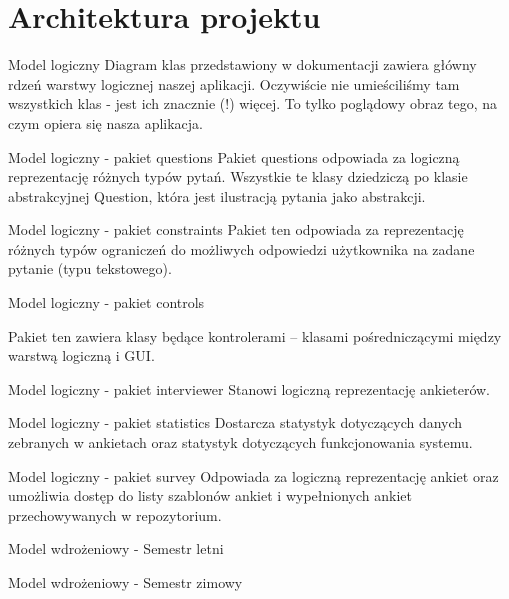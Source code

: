 \documentclass[a4paper,10pt]{beamer}
\begin{document}
	
	\section{Architektura projektu}
	
	
	\begin{frame}{Model logiczny}
		Diagram klas przedstawiony w dokumentacji zawiera główny rdzeń warstwy logicznej naszej aplikacji. Oczywiście nie umieściliśmy tam wszystkich klas - jest ich znacznie (!) więcej. To tylko poglądowy obraz tego, na czym opiera się nasza aplikacja.
	\end{frame}
	\begin{frame}{Model logiczny - pakiet questions}
		Pakiet questions odpowiada za logiczną reprezentację różnych typów pytań. 	Wszystkie te klasy dziedziczą po klasie abstrakcyjnej Question, która jest ilustracją pytania jako abstrakcji.
	\end{frame}
	\begin{frame}{Model logiczny - pakiet constraints}
		Pakiet ten odpowiada za reprezentację różnych typów ograniczeń do możliwych odpowiedzi użytkownika na zadane pytanie (typu tekstowego).
		
	\end{frame}
	

	\begin{frame}{Model logiczny - pakiet controls}
		
		Pakiet ten zawiera klasy będące kontrolerami – klasami pośredniczącymi między warstwą logiczną i GUI.
	\end{frame}
	
	\begin{frame}{Model logiczny - pakiet interviewer}
		Stanowi logiczną reprezentację ankieterów.
	\end{frame}
	\begin{frame}{Model logiczny - pakiet statistics}
		Dostarcza statystyk dotyczących danych zebranych w ankietach oraz statystyk dotyczących funkcjonowania systemu.
	\end{frame}
	\begin{frame}{Model logiczny - pakiet survey}
		Odpowiada za logiczną reprezentację ankiet oraz umożliwia dostęp do listy szablonów ankiet i wypełnionych ankiet przechowywanych w repozytorium.
	\end{frame}
	
	\begin{frame}{Model wdrożeniowy - Semestr letni}
	\end{frame}
	\begin{frame}{Model wdrożeniowy - Semestr zimowy}
	\end{frame}
	
\end{document}
